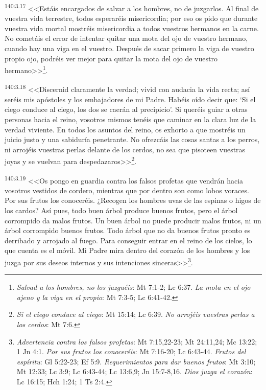 \par 
\textsuperscript{140:3.17} <<Estáis encargados de salvar a los hombres, no de juzgarlos. Al final de vuestra vida terrestre, todos esperaréis misericordia; por eso os pido que durante vuestra vida mortal mostréis misericordia a todos vuestros hermanos en la carne. No cometáis el error de intentar quitar una mota del ojo de vuestro hermano, cuando hay una viga en el vuestro. Después de sacar primero la viga de vuestro propio ojo, podréis ver mejor para quitar la mota del ojo de vuestro hermano>>\footnote{\textit{Salvad a los hombres, no los juzguéis}: Mt 7:1-2; Lc 6:37. \textit{La mota en el ojo ajeno y la viga en el propio}: Mt 7:3-5; Lc 6:41-42.}.

\par 
\textsuperscript{140:3.18} <<Discernid claramente la verdad; vivid con audacia la vida recta; así seréis mis apóstoles y los embajadores de mi Padre. Habéis oído decir que: `Si el ciego conduce al ciego, los dos se caerán al precipicio'. Si queréis guiar a otras personas hacia el reino, vosotros mismos tenéis que caminar en la clara luz de la verdad viviente. En todos los asuntos del reino, os exhorto a que mostréis un juicio justo y una sabiduría penetrante. No ofrezcáis las cosas santas a los perros, ni arrojéis vuestras perlas delante de los cerdos, no sea que pisoteen vuestras joyas y se vuelvan para despedazaros>>\footnote{\textit{Si el ciego conduce al ciego}: Mt 15:14; Lc 6:39. \textit{No arrojéis vuestras perlas a los cerdos}: Mt 7:6.}.

\par 
\textsuperscript{140:3.19} <<Os pongo en guardia contra los falsos profetas que vendrán hacia vosotros vestidos de cordero, mientras que por dentro son como lobos voraces. Por sus frutos los conoceréis. ¿Recogen los hombres uvas de las espinas o higos de los cardos? Así pues, todo buen árbol produce buenos frutos, pero el árbol corrompido da malos frutos. Un buen árbol no puede producir malos frutos, ni un árbol corrompido buenos frutos. Todo árbol que no da buenos frutos pronto es derribado y arrojado al fuego. Para conseguir entrar en el reino de los cielos, lo que cuenta es el móvil. Mi Padre mira dentro del corazón de los hombres y los juzga por sus deseos internos y sus intenciones sinceras>>\footnote{\textit{Advertencia contra los falsos profetas}: Mt 7:15,22-23; Mt 24:11,24; Mc 13:22; 1 Jn 4:1. \textit{Por sus frutos los conoceréis}: Mt 7:16-20; Lc 6:43-44. \textit{Frutos del espíritu}: Gl 5:22-23; Ef 5:9. \textit{Requerimientos para dar buenos frutos}: Mt 3:10; Mt 12:33; Lc 3:9; Lc 6:43-44; Lc 13:6,9; Jn 15:7-8,16. \textit{Dios juzga el corazón}: Lc 16:15; Hch 1:24; 1 Ts 2:4.}.

